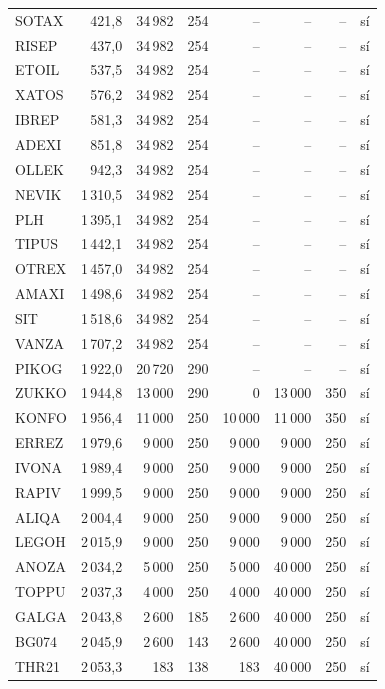 \begin{longtable}{lrrrrrrc}
SOTAX & 421,8 & 34\,982 & 254 & -- & -- & -- & sí\\
RISEP & 437,0 & 34\,982 & 254 & -- & -- & -- & sí\\
ETOIL & 537,5 & 34\,982 & 254 & -- & -- & -- & sí\\
XATOS & 576,2 & 34\,982 & 254 & -- & -- & -- & sí\\
IBREP & 581,3 & 34\,982 & 254 & -- & -- & -- & sí\\
ADEXI & 851,8 & 34\,982 & 254 & -- & -- & -- & sí\\
OLLEK & 942,3 & 34\,982 & 254 & -- & -- & -- & sí\\
NEVIK & 1\,310,5 & 34\,982 & 254 & -- & -- & -- & sí\\
PLH & 1\,395,1 & 34\,982 & 254 & -- & -- & -- & sí\\
TIPUS & 1\,442,1 & 34\,982 & 254 & -- & -- & -- & sí\\
OTREX & 1\,457,0 & 34\,982 & 254 & -- & -- & -- & sí\\
AMAXI & 1\,498,6 & 34\,982 & 254 & -- & -- & -- & sí\\
SIT & 1\,518,6 & 34\,982 & 254 & -- & -- & -- & sí\\
VANZA & 1\,707,2 & 34\,982 & 254 & -- & -- & -- & sí\\
PIKOG & 1\,922,0 & 20\,720 & 290 & -- & -- & -- & sí\\
ZUKKO & 1\,944,8 & 13\,000 & 290 & 0 & 13\,000 & 350 & sí\\
KONFO & 1\,956,4 & 11\,000 & 250 & 10\,000 & 11\,000 & 350 & sí\\
ERREZ & 1\,979,6 & 9\,000 & 250 & 9\,000 & 9\,000 & 250 & sí\\
IVONA & 1\,989,4 & 9\,000 & 250 & 9\,000 & 9\,000 & 250 & sí\\
RAPIV & 1\,999,5 & 9\,000 & 250 & 9\,000 & 9\,000 & 250 & sí\\
ALIQA & 2\,004,4 & 9\,000 & 250 & 9\,000 & 9\,000 & 250 & sí\\
LEGOH & 2\,015,9 & 9\,000 & 250 & 9\,000 & 9\,000 & 250 & sí\\
ANOZA & 2\,034,2 & 5\,000 & 250 & 5\,000 & 40\,000 & 250 & sí\\
TOPPU & 2\,037,3 & 4\,000 & 250 & 4\,000 & 40\,000 & 250 & sí\\
GALGA & 2\,043,8 & 2\,600 & 185 & 2\,600 & 40\,000 & 250 & sí\\
BG074 & 2\,045,9 & 2\,600 & 143 & 2\,600 & 40\,000 & 250 & sí\\
THR21 & 2\,053,3 & 183 & 138 & 183 & 40\,000 & 250 & sí\\
\end{longtable}
\endgroup
